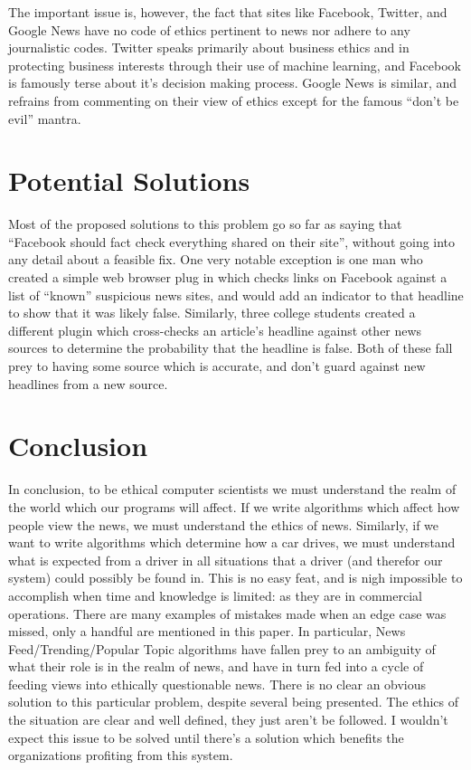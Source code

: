 \documentclass{article}
\begin{document}
The important issue is, however, the fact that sites like Facebook, Twitter, and Google News have no code of ethics pertinent to news nor adhere to any journalistic codes. Twitter speaks primarily about business ethics and in protecting business interests through their use of machine learning, and Facebook is famously terse about it's decision making process. \cite{lecher_facebook_2016,jeffries_twitter_2014,twitter_twitter_2016} Google News is similar, and refrains from commenting on their view of ethics except for the famous ``don't be evil'' mantra. \cite{platts_digital_2014}

\section*{Potential Solutions}
Most of the proposed solutions to this problem go so far as saying that ``Facebook should fact check everything shared on their site'', without going into any detail about a feasible fix. One very notable exception is one man who created a simple web browser plug in which checks links on Facebook against a list of ``known'' suspicious news sites, and would add an indicator to that headline to show that it was likely false. \cite{cellan-jones_fake_2016} Similarly, three college students created a different plugin which cross-checks an article's headline against other news sources to determine the probability that the headline is false. \cite{luckett_heres_2016} Both of these fall prey to having some source which is accurate, and don't guard against new headlines from a new source. 

\section*{Conclusion}
In conclusion, to be ethical computer scientists we must understand the realm of the world which our programs will affect. If we write algorithms which affect how people view the news, we must understand the ethics of news. Similarly, if we want to write algorithms which determine how a car drives, we must understand what is expected from a driver in all situations that a driver (and therefor our system) could possibly be found in. This is no easy feat, and is nigh impossible to accomplish when time and knowledge is limited: as they are in commercial operations. There are many examples of mistakes made when an edge case was missed, only a handful are mentioned in this paper. In particular, News Feed/Trending/Popular Topic algorithms have fallen prey to an ambiguity of what their role is in the realm of news, and have in turn fed into a cycle of feeding views into ethically questionable news. There is no clear an obvious solution to this particular problem, despite several being presented. The ethics of the situation are clear and well defined, they just aren't be followed. I wouldn't expect this issue to be solved until there's a solution which benefits the organizations profiting from this system.

\newpage


\end{document}
